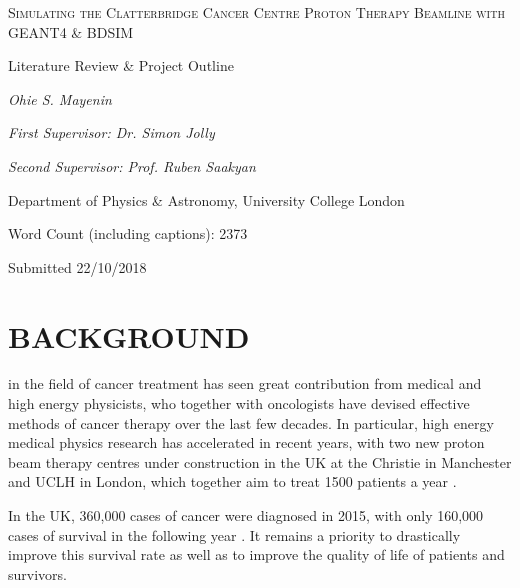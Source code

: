 \documentclass[a4paper, 12pt, conference]
{ieeeconf}      %
\begin{document}
\begin{titlepage}
	\centering
     
	{\scshape\Huge Simulating the Clatterbridge Cancer Centre Proton Therapy Beamline with GEANT4 \& BDSIM \par}
	\vspace{0.5cm}
	{\scshape\Large{Literature Review \& Project Outline\par}}
	\vspace{1cm}
	{\large\itshape Ohie S. Mayenin\par}
    \vspace{1cm}
    {\itshape First Supervisor: Dr. Simon Jolly\par}
    {\itshape Second Supervisor: Prof. Ruben Saakyan\par}
    \vspace{0.5cm}
    {Department of Physics \& Astronomy, University College London\par}
	\vspace{1cm}
    \vfill
	Word Count (including captions): 2373 \par
	{Submitted 22/10/2018}
	\vfill
\end{titlepage}





\section{BACKGROUND}

 in the field of cancer treatment has seen great contribution from medical and high energy physicists, who together with oncologists have devised effective methods of cancer therapy over the last few decades. In particular, high energy medical physics research has accelerated in recent years, with two new proton beam therapy centres under construction in the UK at the Christie in Manchester and UCLH in London, which together aim to treat 1500 patients a year \cite{hep}. 

In the UK, 360,000 cases of cancer were diagnosed in 2015, with only 160,000 cases of survival in the following year \cite{cancerstatistics}. It remains a priority to drastically improve this survival rate as well as to improve the quality of life of patients and survivors.
\end{document}
